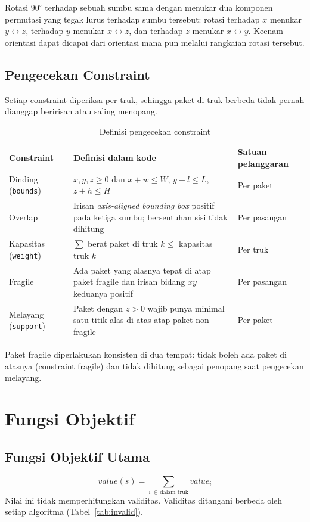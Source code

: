 \documentclass[12pt,a4paper]{report}
\newcommand{\hd}[1]{\cellcolor{hdr}\textbf{#1}}
\newcommand{\code}[1]{\texttt{\small #1}}
\begin{document}
Rotasi $90^\circ$ terhadap sebuah sumbu sama dengan menukar dua komponen permutasi yang tegak
lurus terhadap sumbu tersebut: rotasi terhadap $x$ menukar $y \leftrightarrow z$, terhadap $y$
menukar $x \leftrightarrow z$, dan terhadap $z$ menukar $x \leftrightarrow y$. Keenam orientasi
dapat dicapai dari orientasi mana pun melalui rangkaian rotasi tersebut.

\subsection{Pengecekan Constraint}
Setiap constraint diperiksa per truk, sehingga paket di truk berbeda tidak pernah dianggap
beririsan atau saling menopang.

\begin{table}[H]
\centering
\caption{Definisi pengecekan constraint}\label{tab:constraint}
\small
\begin{tabular}{|L{3cm}|L{7.4cm}|L{2.8cm}|}
\hline
\hd{Constraint} & \hd{Definisi dalam kode} & \hd{Satuan pelanggaran} \\ \hline
Dinding (\code{bounds}) & $x,y,z \ge 0$ dan $x+w \le W$, $y+l \le L$, $z+h \le H$ & Per paket \\ \hline
Overlap & Irisan \textit{axis-aligned bounding box} positif pada ketiga sumbu; bersentuhan sisi tidak dihitung & Per pasangan \\ \hline
Kapasitas (\code{weight}) & $\sum$ berat paket di truk $k \le$ kapasitas truk $k$ & Per truk \\ \hline
Fragile & Ada paket yang alasnya tepat di atap paket fragile dan irisan bidang $xy$ keduanya positif & Per pasangan \\ \hline
Melayang (\code{support}) & Paket dengan $z > 0$ wajib punya minimal satu titik alas di atas atap paket non-fragile & Per paket \\ \hline
\end{tabular}
\end{table}

Paket fragile diperlakukan konsisten di dua tempat: tidak boleh ada paket di atasnya
(constraint fragile) dan tidak dihitung sebagai penopang saat pengecekan melayang.

\section{Fungsi Objektif}
\subsection{Fungsi Objektif Utama}
\[
value(s) = \sum_{i \,\in\, \text{dalam truk}} value_i
\]
Nilai ini tidak memperhitungkan validitas. Validitas ditangani berbeda oleh setiap algoritma
(Tabel~\ref{tab:invalid}).
\end{document}
